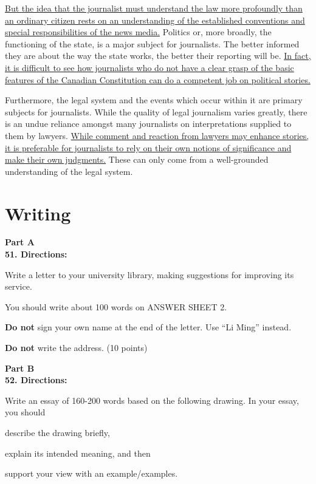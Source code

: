 \transnum \uline{But the idea that the journalist must understand the law
more profoundly than an ordinary citizen rests on an understanding of
the established conventions and special responsibilities of the news
media.} Politics or, more broadly, the functioning of the state, is a
major subject for journalists. The better informed they are about the
way the state works, the better their reporting will be.
\transnum \uline{In fact, it is difficult to see how journalists who do
not have a clear grasp of the basic features of the Canadian
Constitution can do a competent job on political stories.}

Furthermore, the legal system and the events which occur within it are
primary subjects for journalists. While the quality of legal journalism
varies greatly, there is an undue reliance amongst many journalists on
interpretations supplied to them by lawyers. \transnum \uline{While
comment and reaction from lawyers may enhance stories, it is preferable
for journalists to rely on their own notions of significance and make
their own judgments.} These can only come from a well-grounded
understanding of the legal system.




\newpage

\section{Writing}


\noindent
\textbf{Part A}\\
\textbf{51. Directions:}

Write a letter to your university library, making suggestions for
improving its service.

You should write about 100 words on ANSWER SHEET 2.

\textbf{Do not} sign your own name at the end of the letter. Use ``Li
Ming'' instead.

\textbf{Do not} write the address. (10 points)


\vspace{2em}


\noindent
\textbf{Part B}\\
\textbf{52. Directions:}

Write an essay of 160-200 words based on the following drawing. In your
essay, you should
\begin{listwrite}
	\item
 describe the drawing briefly,

\item 
 explain its intended meaning, and then

\item 
 support your view with an example/examples.
\end{listwrite}

